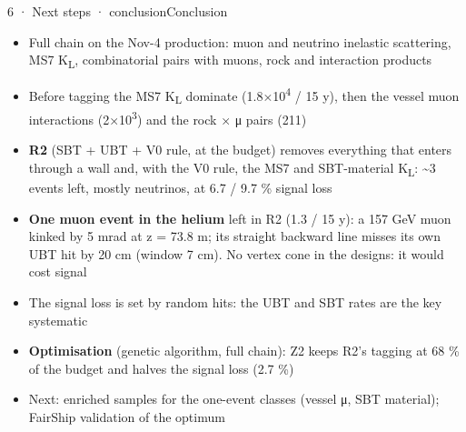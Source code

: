 \begin{btframe}{6 · Next steps · conclusion}{Conclusion}
{\fontsize{6.15pt}{8.60pt}\selectfont
\begin{itemize}
  \item Full chain on the Nov-4 production: muon and neutrino inelastic scattering, MS7 K\textsubscript{L}, combinatorial pairs with muons, rock and interaction products
  \item Before tagging the MS7 K\textsubscript{L} dominate (1.8×10\textsuperscript{4} / 15 y), then the vessel muon interactions (2×10\textsuperscript{3}) and the rock × μ pairs (211)
  \item \textbf{R2} (SBT + UBT + V0 rule, at the budget) removes everything that enters through a wall and, with the V0 rule, the MS7 and SBT-material K\textsubscript{L}: \textasciitilde{}3 events left, mostly neutrinos, at 6.7 / 9.7 \% signal loss
  \item \textbf{One muon event in the helium} left in R2 (1.3 / 15 y): a 157 GeV muon kinked by 5 mrad at z = 73.8 m; its straight backward line misses its own UBT hit by 20 cm (window 7 cm). No vertex cone in the designs: it would cost signal
  \item The signal loss is set by random hits: the UBT and SBT rates are the key systematic
  \item \textbf{Optimisation} (genetic algorithm, full chain): Z2 keeps R2's tagging at 68 \% of the budget and halves the signal loss (2.7 \%)
  \item Next: enriched samples for the one-event classes (vessel μ, SBT material); FairShip validation of the optimum
\end{itemize}}
\end{btframe}
